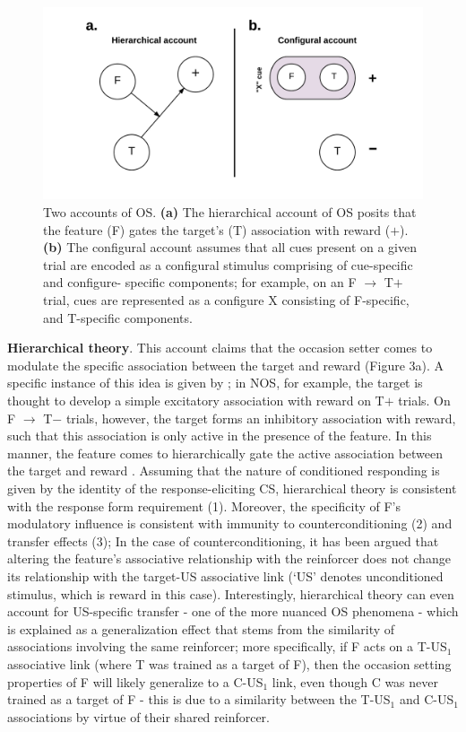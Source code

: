 \documentclass[11pt]{article}
\newcommand{\bsf}[1]{\textbf{#1}}
\let\cite=\citep
\let\citeN=\citet
\begin{document}
\begin{figure}[h]
\centering
\includegraphics[width=\textwidth]{Figures/Fig3}
\caption{Two accounts of OS. \bsf{(a)} The hierarchical account of OS posits 
that the feature (F) gates the target's (T) association with reward ($+$). 
\bsf{(b)} The configural account assumes that all cues present on a given trial 
are encoded as a configural stimulus comprising of cue-specific and configure-
specific components; for example, on an F $\rightarrow$ T$+$ trial, cues are 
represented as a configure X consisting of F-specific, and T-specific 
components.}
\label{fig:traditionalAccounts}
\end{figure}

{\bf Hierarchical theory}. This account claims that the occasion setter comes 
to modulate the specific association between the target and reward (Figure 3a). 
A specific instance of this idea is given by \citeN{Bouton1998}; in NOS, for 
example, the target is thought to develop a simple excitatory association with 
reward on T$+$ trials. On F $\rightarrow$ T$-$ trials, however, the target 
forms an inhibitory association with reward, such that this association is only 
active in the presence of the feature. In this manner, the feature comes to 
hierarchically gate the active association between the target and reward 
\cite{Bouton1998}. Assuming that the nature of conditioned responding is given 
by the identity of the response-eliciting CS, hierarchical theory is consistent 
with the response form requirement (1). Moreover, the specificity of F's 
modulatory influence is consistent with immunity to counterconditioning (2) and 
transfer effects (3); In the case of counterconditioning, it has been argued 
that altering the feature's associative relationship with the reinforcer does 
not change its relationship with the target-US associative link (`US' denotes 
unconditioned stimulus, which is reward in this case). Interestingly, 
hierarchical theory can even account for US-specific transfer - one of the more 
nuanced OS phenomena - which is explained as a generalization effect that stems 
from the similarity of associations involving the same reinforcer; more 
specifically, if F acts on a T-US$_{1}$ associative link (where T was trained 
as a target of F), then the occasion setting properties of F will likely 
generalize to a C-US$_{1}$ link, even though C was never trained as a target of 
F - this is due to a similarity between the T-US$_{1}$ and C-US$_{1}$ 
associations by virtue of their shared reinforcer.
\end{document}
